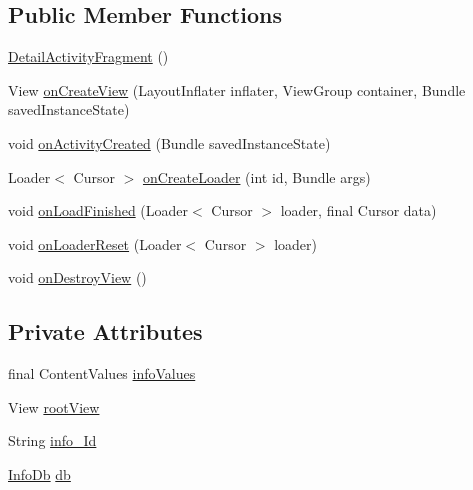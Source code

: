 \subsection*{Public Member Functions}
\begin{DoxyCompactItemize}
\item 
\hyperlink{classorg_1_1buildmlearn_1_1infotemplate_1_1fragment_1_1DetailActivityFragment_a3d7cdfa9e6f32a01386e9ec22691ab94}{Detail\+Activity\+Fragment} ()
\item 
View \hyperlink{classorg_1_1buildmlearn_1_1infotemplate_1_1fragment_1_1DetailActivityFragment_a73bf792286fe1fbd5ffc15f81f6efd33}{on\+Create\+View} (Layout\+Inflater inflater, View\+Group container, Bundle saved\+Instance\+State)
\item 
void \hyperlink{classorg_1_1buildmlearn_1_1infotemplate_1_1fragment_1_1DetailActivityFragment_a0ec399cc117bf897ee44916171048c19}{on\+Activity\+Created} (Bundle saved\+Instance\+State)
\item 
Loader$<$ Cursor $>$ \hyperlink{classorg_1_1buildmlearn_1_1infotemplate_1_1fragment_1_1DetailActivityFragment_a6aaad137691a4a076d36202d6f7cfd48}{on\+Create\+Loader} (int id, Bundle args)
\item 
void \hyperlink{classorg_1_1buildmlearn_1_1infotemplate_1_1fragment_1_1DetailActivityFragment_a41c06c2781bac4256b815472667c16c9}{on\+Load\+Finished} (Loader$<$ Cursor $>$ loader, final Cursor data)
\item 
void \hyperlink{classorg_1_1buildmlearn_1_1infotemplate_1_1fragment_1_1DetailActivityFragment_aa91296afa2c79ecdd1e7e93a7bce85e8}{on\+Loader\+Reset} (Loader$<$ Cursor $>$ loader)
\item 
void \hyperlink{classorg_1_1buildmlearn_1_1infotemplate_1_1fragment_1_1DetailActivityFragment_a2709a924087248c3fe831813a9fff686}{on\+Destroy\+View} ()
\end{DoxyCompactItemize}
\subsection*{Private Attributes}
\begin{DoxyCompactItemize}
\item 
final Content\+Values \hyperlink{classorg_1_1buildmlearn_1_1infotemplate_1_1fragment_1_1DetailActivityFragment_a02dff9580f9d5cbf3371fea62d1c2e6d}{info\+Values}
\item 
View \hyperlink{classorg_1_1buildmlearn_1_1infotemplate_1_1fragment_1_1DetailActivityFragment_a75cbe5a1b3270fda83663c3eae591fcb}{root\+View}
\item 
String \hyperlink{classorg_1_1buildmlearn_1_1infotemplate_1_1fragment_1_1DetailActivityFragment_a4473f6c58315b6aec50a735b15022959}{info\+\_\+\+Id}
\item 
\hyperlink{classorg_1_1buildmlearn_1_1infotemplate_1_1data_1_1InfoDb}{Info\+Db} \hyperlink{classorg_1_1buildmlearn_1_1infotemplate_1_1fragment_1_1DetailActivityFragment_a21b19b3abbbdbdc7c3b10630794a2df9}{db}
\end{DoxyCompactItemize}
